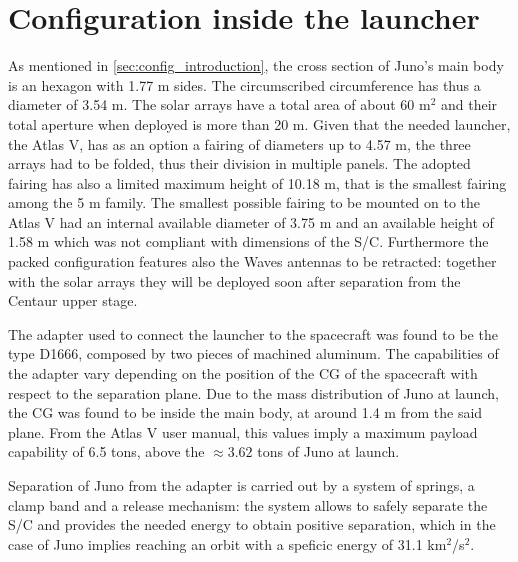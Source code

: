 \section{Configuration inside the launcher}
\label{sec:config_launcher}

As mentioned in \autoref{sec:config_introduction}, the cross section of Juno's main body is an hexagon with 1.77 m sides. The circumscribed circumference has thus a diameter of 3.54 m. The solar arrays have a total area of about 60 m$^2$ and their total aperture when deployed is more than 20 m. Given that the needed launcher, the Atlas V, has as an option a fairing of diameters up to 4.57 m, the three arrays had to be folded, thus their division in multiple panels. The adopted fairing has also a limited maximum height of 10.18 m, that is the smallest fairing among the 5 m family. The smallest possible fairing to be mounted on to the Atlas V had an internal available diameter of 3.75 m and an available height of 1.58 m which was not compliant with dimensions of the S/C. Furthermore the packed configuration features also the Waves antennas to be retracted: together with the solar arrays they will be deployed soon after separation from the Centaur upper stage. 


The adapter used to connect the launcher to the spacecraft was found to be the type D1666, composed by two pieces of machined aluminum. The capabilities of the adapter vary depending on the position of the CG of the spacecraft with respect to the separation plane. Due to the mass distribution of Juno at launch, the CG was found to be inside the main body, at around 1.4 m from the said plane. From the Atlas V user manual, this values imply a maximum payload capability of 6.5 tons, above the $\approx 3.62$ tons of Juno at launch. 
\mref

Separation of Juno from the adapter is carried out by a system of springs, a clamp band and a release mechanism: the system allows to safely separate the S/C and provides the needed energy to obtain positive separation, which in the case of Juno implies reaching an orbit with a speficic energy of 31.1 km$^2$/s$^2$. 


